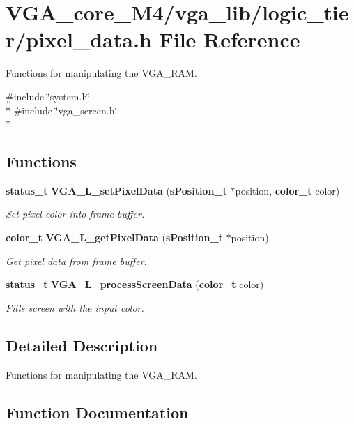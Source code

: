 \section{V\+G\+A\+\_\+core\+\_\+\+M4/vga\+\_\+lib/logic\+\_\+tier/pixel\+\_\+data.h File Reference}
\label{pixel__data_8h}


Functions for manipulating the V\+G\+A\+\_\+\+R\+AM.  


{\ttfamily \#include \char`\"{}system.\+h\char`\"{}}\\*
{\ttfamily \#include \char`\"{}vga\+\_\+screen.\+h\char`\"{}}\\*
\subsection*{Functions}
\begin{DoxyCompactItemize}
\item 
{\bf status\+\_\+t} {\bf V\+G\+A\+\_\+\+L\+\_\+set\+Pixel\+Data} ({\bf s\+Position\+\_\+t} $\ast$position, {\bf color\+\_\+t} color)
\begin{DoxyCompactList}\small\item\em Set pixel color into frame buffer. \end{DoxyCompactList}\item 
{\bf color\+\_\+t} {\bf V\+G\+A\+\_\+\+L\+\_\+get\+Pixel\+Data} ({\bf s\+Position\+\_\+t} $\ast$position)
\begin{DoxyCompactList}\small\item\em Get pixel data from frame buffer. \end{DoxyCompactList}\item 
{\bf status\+\_\+t} {\bf V\+G\+A\+\_\+\+L\+\_\+process\+Screen\+Data} ({\bf color\+\_\+t} color)
\begin{DoxyCompactList}\small\item\em Fills screen with the input color. \end{DoxyCompactList}\end{DoxyCompactItemize}


\subsection{Detailed Description}
Functions for manipulating the V\+G\+A\+\_\+\+R\+AM. 



\subsection{Function Documentation}
